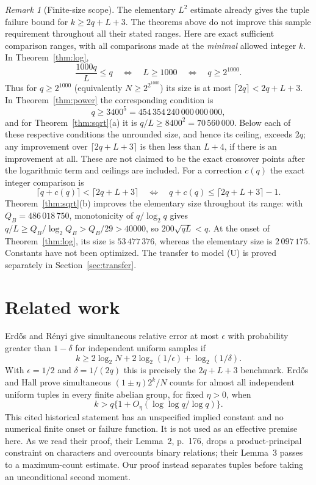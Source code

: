 \documentclass[11pt]{amsart}
\theoremstyle{remark}
\newtheorem*{remark}{Remark}
\newcommand{\QB}{Q_B}
\begin{document}
\begin{remark}[Finite-size scope]\label{rem:scope}
The elementary $L^2$ estimate already gives the tuple failure bound for
$k\ge2q+L+3$. The theorems above do not improve this sample requirement
throughout all their stated ranges. Here are exact sufficient comparison
ranges, with all comparisons made at the \emph{minimal} allowed integer
$k$. In Theorem~\ref{thm:log},
\[
 \frac{1000q}{L}\le q\quad\Longleftrightarrow\quad
 L\ge1000\quad\Longleftrightarrow\quad q\ge2^{1000}.
\]
Thus for $q\ge2^{1000}$ (equivalently $N\ge2^{2^{1000}}$) its size is
at most $\lceil2q\rceil<2q+L+3$. In Theorem~\ref{thm:power} the
corresponding condition is
\[
 q\ge3400^5=454\,354\,240\,000\,000\,000,
\]
and for Theorem~\ref{thm:sqrt}(a) it is
$q/L\ge8400^2=70\,560\,000$. Below each of these respective
conditions the unrounded size, and hence its ceiling, exceeds $2q$;
any improvement over $\lceil2q+L+3\rceil$ is then less than $L+4$,
if there is an improvement at all. These are not claimed to be the
exact crossover points after the logarithmic term and ceilings are
included. For a correction $c(q)$ the exact integer comparison is
\[
 \lceil q+c(q)\rceil<\lceil2q+L+3\rceil
 \quad\Longleftrightarrow\quad
 q+c(q)\le\lceil2q+L+3\rceil-1.
\]
Theorem~\ref{thm:sqrt}(b) improves the elementary size throughout its
range: with $\QB=486\,018\,750$, monotonicity of $q/\log_2q$ gives
$q/L\ge\QB/\log_2\QB>\QB/29>40000$, so $200\sqrt{qL}<q$.
At the onset of Theorem~\ref{thm:log}, its size is $53\,477\,376$,
whereas the elementary size is $2\,097\,175$. Constants have not been
optimized. The transfer to model \textup{(U)} is proved separately in
Section~\ref{sec:transfer}.
\end{remark}

\section{Related work}\label{sec:related}
Erd\H{o}s and R\'enyi \cite[Theorem 1, pp.~131--132]{ER65} give
simultaneous relative error at most $\epsilon$ with probability greater
than $1-\delta$ for independent uniform samples if
\[
 k\ge2\log_2N+2\log_2(1/\epsilon)+\log_2(1/\delta).
\]
With $\epsilon=1/2$ and $\delta=1/(2q)$ this is precisely the
$2q+L+3$ benchmark. Erd\H{o}s and Hall
\cite[unnumbered Theorem, p.~174]{EH76} prove simultaneous
$(1\pm\eta)2^k/N$ counts for almost all independent uniform tuples
in every finite abelian group, for fixed $\eta>0$, when
\[
 k>q\{1+O_\eta(\log\log q/\log q)\}.
\]
This cited historical statement has an unspecified implied constant
and no numerical finite onset or failure function. It is not used as
an effective premise here. As we read their proof, their Lemma~2, p.~176, drops a
product-principal constraint on characters and overcounts binary
relations; their Lemma~3 passes to a maximum-count estimate. Our proof
instead separates tuples before taking an unconditional second moment.
\end{document}
